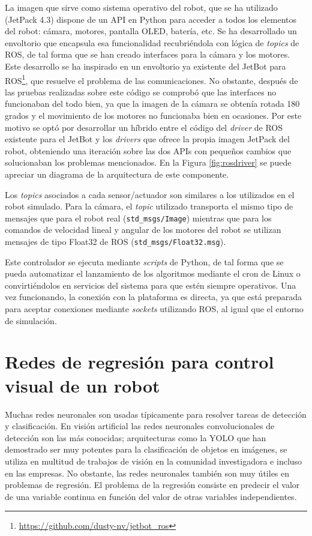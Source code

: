 La imagen que sirve como sistema operativo del robot, que se ha utilizado (JetPack 4.3) dispone de un API en Python para acceder a todos los elementos del robot: cámara, motores, pantalla OLED, batería, etc. Se ha desarrollado un envoltorio que encapsula esa funcionalidad recubriéndola con lógica de \textit{topics} de ROS, de tal forma que se han creado interfaces para la cámara y los motores. Este desarrollo se ha inspirado en un envoltorio ya existente del JetBot para ROS\footnote{\url{https://github.com/dusty-nv/jetbot_ros}}, que resuelve el problema de las comunicaciones. No obstante, después de las pruebas realizadas sobre este código se comprobó que las interfaces no funcionaban del todo bien, ya que la imagen de la cámara se obtenía rotada 180 grados y el movimiento de los motores no funcionaba bien en ocasiones. Por este motivo se optó por desarrollar un híbrido entre el código del \textit{driver} de ROS existente para el JetBot y los \textit{drivers} que ofrece la propia imagen JetPack del robot, obteniendo una iteración sobre las dos APIs con pequeños cambios que solucionaban los problemas mencionados. En la Figura \ref{fig:rosdriver} se puede apreciar un diagrama de la arquitectura de este componente.

Los \textit{topics} asociados a cada sensor/actuador son similares a los utilizados en el robot simulado. Para la cámara, el \textit{topic} utilizado transporta el mismo tipo de mensajes que para el robot real (\texttt{std\_msgs/Image}) mientras que para los comandos de velocidad lineal y angular de los motores del robot se utilizan mensajes de tipo Float32 de ROS (\texttt{std\_msgs/Float32.msg}).

Este controlador se ejecuta mediante \textit{scripts} de Python, de tal forma que se pueda automatizar el lanzamiento de los algoritmos mediante el cron de Linux o convirtiéndolos en servicios del sistema para que estén siempre operativos. Una vez funcionando, la conexión con la plataforma es directa, ya que está preparada para aceptar conexiones mediante \textit{sockets} utilizando ROS, al igual que el entorno de simulación.

\section{Redes de regresión para control visual de un robot}
\label{sec:regression}

Muchas redes neuronales son usadas típicamente para resolver tareas de detección y clasificación. En visión artificial las redes neuronales convolucionales de detección son las más conocidas; arquitecturas como la YOLO que han demostrado ser muy potentes para la clasificación de objetos en imágenes, se utiliza en multitud de trabajos de visión en la comunidad investigadora e incluso en las empresas. No obstante, las redes neuronales también son muy útiles en problemas de regresión. El problema de la regresión consiste en predecir el valor de una variable continua en función del valor de otras variables independientes.

